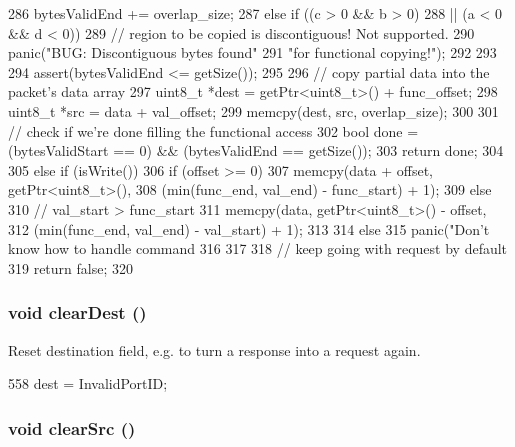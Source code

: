 \begin{DoxyCode}
{{{{{286                     bytesValidEnd += overlap_size;
287                 } else if ((c > 0 && b > 0)
288                            || (a < 0 && d < 0)) {
289                     // region to be copied is discontiguous! Not supported.
290                     panic("BUG: Discontiguous bytes found"
291                           "for functional copying!");
292                 }
293             }
294             assert(bytesValidEnd <= getSize());
295 
296             // copy partial data into the packet's data array
297             uint8_t *dest = getPtr<uint8_t>() + func_offset;
298             uint8_t *src = data + val_offset;
299             memcpy(dest, src, overlap_size);
300 
301             // check if we're done filling the functional access
302             bool done = (bytesValidStart == 0) && (bytesValidEnd == getSize());
303             return done;
304         }
305     } else if (isWrite()) {
306         if (offset >= 0) {
307             memcpy(data + offset, getPtr<uint8_t>(),
308                    (min(func_end, val_end) - func_start) + 1);
309         } else {
310             // val_start > func_start
311             memcpy(data, getPtr<uint8_t>() - offset,
312                    (min(func_end, val_end) - val_start) + 1);
313         }
314     } else {
315         panic("Don't know how to handle command %
316     }
317 
318     // keep going with request by default
319     return false;
320 }
\end{DoxyCode}
\hypertarget{classPacket_a2d986bc7c63bf7c63e392296d32f77ae}{
\subsubsection[{clearDest}]{\setlength{\rightskip}{0pt plus 5cm}void clearDest ()}}
\label{classPacket_a2d986bc7c63bf7c63e392296d32f77ae}


Reset destination field, e.g. to turn a response into a request again. 


\begin{DoxyCode}
558 { dest = InvalidPortID; }
\end{DoxyCode}
\hypertarget{classPacket_a65f22eb305e0e75fe1c4e484f046c00e}{
\subsubsection[{clearSrc}]{\setlength{\rightskip}{0pt plus 5cm}void clearSrc ()}}
\label{classPacket_a65f22eb305e0e75fe1c4e484f046c00e}



